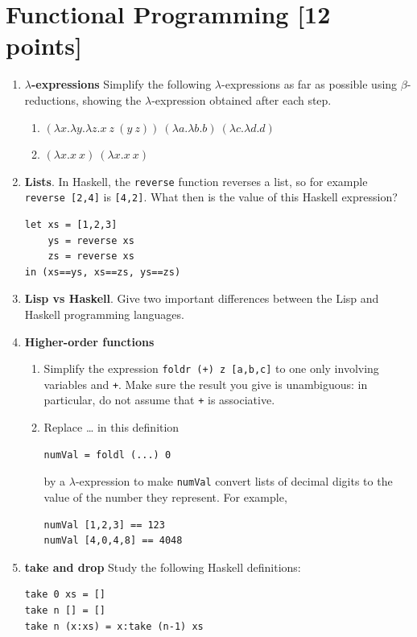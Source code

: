 \documentclass{article}
\begin{document}
\section{Functional Programming [12 points]}
\begin{enumerate}
\item {\bf $\lambda$-expressions}
Simplify the following $\lambda$-expressions as far as possible using $\beta$-reductions, showing the $\lambda$-expression obtained after each step.
\begin{enumerate}
\item
$(\lambda x.\lambda y.\lambda z.x~z~(y~z))~(\lambda a.\lambda b.b)~(\lambda c.\lambda d.d)$
\item
$(\lambda x.x~x)~(\lambda x.x~x)$
\end{enumerate}
\item {\bf Lists}.  In Haskell, the \verb!reverse! function reverses a
  list, so for example \verb!reverse [2,4]! is
  \verb![4,2]!.  What then is the value of this Haskell expression?
\begin{verbatim}
let xs = [1,2,3]
    ys = reverse xs
    zs = reverse xs
in (xs==ys, xs==zs, ys==zs)
\end{verbatim}
\item {\bf Lisp vs Haskell}.  Give two important differences between
 the Lisp and Haskell programming languages. 
\item {\bf Higher-order functions}
\begin{enumerate}
\item Simplify the expression \verb!foldr (+) z [a,b,c]! to one only
  involving variables and \verb!+!. Make sure the result you give is
  unambiguous: in particular, do not assume that \verb!+! is
  associative.
\item Replace \dots{} in this definition
\begin{verbatim}
numVal = foldl (...) 0
\end{verbatim}
by a $\lambda$-expression to make \verb!numVal! convert lists of decimal digits to the value of the number they represent. For example,
\begin{verbatim}
numVal [1,2,3] == 123
numVal [4,0,4,8] == 4048
\end{verbatim}
\end{enumerate}
\item {\bf take and drop}
Study the following Haskell definitions:
\begin{verbatim}
take 0 xs = []
take n [] = []
take n (x:xs) = x:take (n-1) xs


\end{verbatim}
\end{enumerate}
\end{document}
